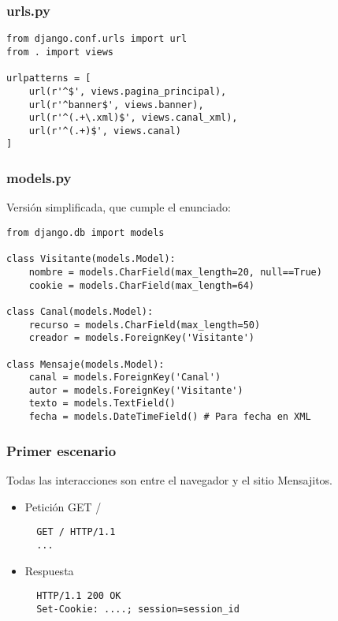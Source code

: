{\subsubsection*{urls.py}

\begin{verbatim}
from django.conf.urls import url
from . import views

urlpatterns = [
    url(r'^$', views.pagina_principal),
    url(r'^banner$', views.banner),
    url(r'^(.+\.xml)$', views.canal_xml),
    url(r'^(.+)$', views.canal)
]
\end{verbatim}

\subsubsection*{models.py}

Versión simplificada, que cumple el enunciado:

\begin{verbatim}
from django.db import models

class Visitante(models.Model):
    nombre = models.CharField(max_length=20, null==True)
    cookie = models.CharField(max_length=64)

class Canal(models.Model):
    recurso = models.CharField(max_length=50)
    creador = models.ForeignKey('Visitante')

class Mensaje(models.Model):
    canal = models.ForeignKey('Canal')
    autor = models.ForeignKey('Visitante')
    texto = models.TextField()
    fecha = models.DateTimeField() # Para fecha en XML
\end{verbatim}


\subsubsection*{Primer escenario}

Todas las interacciones son entre el navegador y el sitio Mensajitos.

\begin{itemize}
\item Petición GET /

\begin{verbatim}
  GET / HTTP/1.1
  ...
\end{verbatim}

\item Respuesta

\begin{verbatim}
  HTTP/1.1 200 OK
  Set-Cookie: ....; session=session_id


\end{verbatim}
\end{itemize}}
